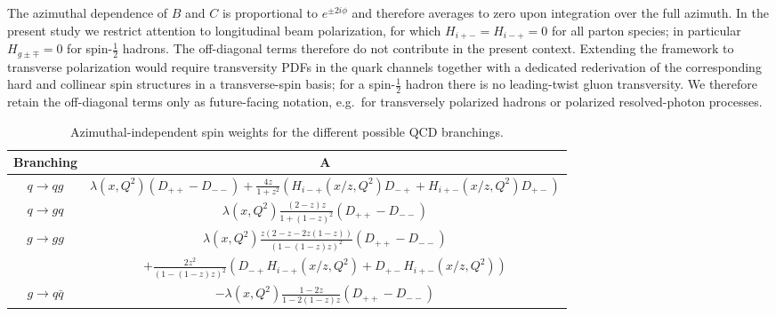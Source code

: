 \documentclass[a4paper,11pt]{article}
\begin{document}
The azimuthal dependence of $B$ and $C$ is proportional to $e^{\pm 2 i\phi}$ and therefore averages to zero upon integration over the full azimuth.
In the present study we restrict attention to longitudinal beam polarization, for which $H_{i+-}=H_{i-+}=0$ for all parton species; in particular $H_{g\pm\mp}=0$ for spin-$\frac12$ hadrons. The off-diagonal terms therefore do not contribute in the present context. Extending the framework to transverse polarization would require transversity PDFs in the quark channels together with a dedicated rederivation of the corresponding hard and collinear spin structures in a transverse-spin basis; for a spin-$\frac12$ hadron there is no leading-twist gluon transversity. We therefore retain the off-diagonal terms only as future-facing notation, e.g.\ for transversely polarized hadrons or polarized resolved-photon processes.
\begin{table}
  \begin{center}
    \begin{tabular}{|c|c|}
      \hline
      Branching & A \\
      \hline
      $q\to qg$ & $\lambda(x,Q^2) \left(D_{++}-D_{--}\right)+\frac{4 z}{1+z^2} \left(H_{i-+}(x/z,Q^2)D_{-+} +H_{i+-}(x/z,Q^2)D_{+-} \right)$ \\
      \hline
      $q\to gq$ & $\lambda(x,Q^2) \frac{  (2-z) z}{1+(1-z)^2} \left(D_{++}-D_{--}\right)$ \\
      \hline
      $g\to gg$ & $\lambda(x,Q^2) \frac{z (2-z -2z(1-z))}{(1-(1-z) z)^2} \left(D_{++}-D_{--}\right)$ \\
      & $+\frac{2 z^2}{(1-(1-z)z)^2}\left(D_{-+} H_{i-+}(x/z,Q^2)+D_{+-}H_{i+-}(x/z,Q^2)\right)$\\
      \hline
      $g\to q\bar{q}$ & $-\lambda(x,Q^2) \frac{1-2 z}{1-2 (1-z) z}\left(D_{++}-D_{--}\right)$ \\
      \hline
  \end{tabular}
    \caption{Azimuthal-independent spin weights for the different possible QCD branchings.}
    \label{tab:branch1}
  \end{center}
\end{table}
\end{document}
